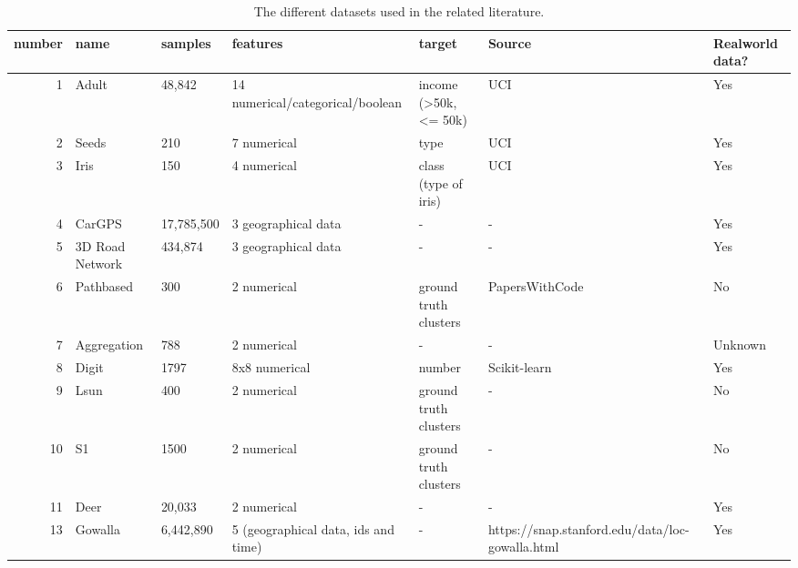 \begin{table}
  \centering

  \begin{tabular}{rllllll}
    \toprule
    number & name            & samples    & features                            & target                & Source                                          & Realworld data? \\
    \midrule
    1      & Adult           & 48,842     & 14 numerical/categorical/boolean    & income (>50k, <= 50k) & UCI                                             & Yes             \\
    2      & Seeds           & 210        & 7 numerical                         & type                  & UCI                                             & Yes             \\
    3      & Iris            & 150        & 4 numerical                         & class (type of iris)  & UCI                                             & Yes             \\
    4      & CarGPS          & 17,785,500 & 3 geographical data                 & -                     & -                                               & Yes             \\
    5      & 3D Road Network & 434,874    & 3 geographical data                 & -                     & -                                               & Yes             \\
    6      & Pathbased       & 300        & 2 numerical                         & ground truth clusters & PapersWithCode                                  & No              \\
    7      & Aggregation     & 788        & 2 numerical                         & -                     & -                                               & Unknown         \\
    8      & Digit           & 1797       & 8x8 numerical                       & number                & Scikit-learn                                    & Yes             \\
    9      & Lsun            & 400        & 2 numerical                         & ground truth clusters & -                                               & No              \\
    10     & S1              & 1500       & 2 numerical                         & ground truth clusters & -                                               & No              \\
    11     & Deer            & 20,033     & 2 numerical                         & -                     & -                                               & Yes             \\
    13     & Gowalla         & 6,442,890  & 5 (geographical data, ids and time) & -                     & https://snap.stanford.edu/data/loc-gowalla.html & Yes             \\
    \bottomrule
  \end{tabular}
  \caption{The different datasets used in the related literature.}
  \label{tab:datasets}
\end{table}